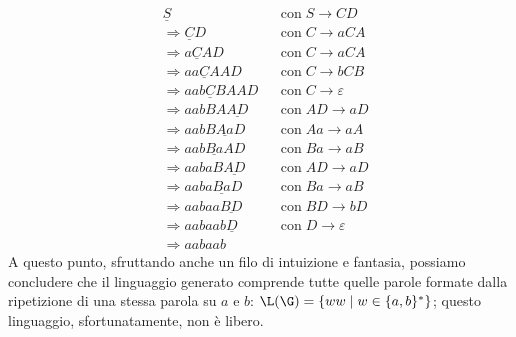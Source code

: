 \documentclass[class=book, crop=false, oneside, 12pt]{standalone}
\begin{document}
  \begin{align*}
    &\underline{S} & &\textrm{con}\; S \to CD\\
    &\Rightarrow \underline{C}D  & &\textrm{con}\; C \to aCA \\
    &\Rightarrow a\underline{C}AD & &\textrm{con}\; C \to aCA \\
    &\Rightarrow aa\underline{C}AAD & &\textrm{con}\; C \to bCB \\
    &\Rightarrow aab\underline{C}BAAD & &\textrm{con}\; C \to \varepsilon \\
    &\Rightarrow aabBA\underline{AD} & &\textrm{con}\; AD \to aD \\
    &\Rightarrow aabB\underline{Aa}D & &\textrm{con}\; Aa \to aA \\
    &\Rightarrow aab\underline{Ba}AD & &\textrm{con}\; Ba \to aB \\
    &\Rightarrow aabaB\underline{AD} & &\textrm{con}\; AD \to aD \\
    &\Rightarrow aaba\underline{Ba}D & &\textrm{con}\; Ba \to aB \\
    &\Rightarrow aabaa\underline{BD} & &\textrm{con}\; BD \to bD \\
    &\Rightarrow aabaab\underline{D} & &\textrm{con}\; D \to \varepsilon \\
    &\Rightarrow aabaab 
  \end{align*}
  A questo punto, sfruttando anche un filo di intuizione e fantasia, possiamo concludere che il linguaggio generato comprende tutte quelle parole formate dalla ripetizione di una stessa parola su \(a\) e \(b\): \(\L(\G) =\{ww \mid w\in\{a,b\}^*\}\); questo linguaggio, sfortunatamente, non è libero. 
  
\end{document}

